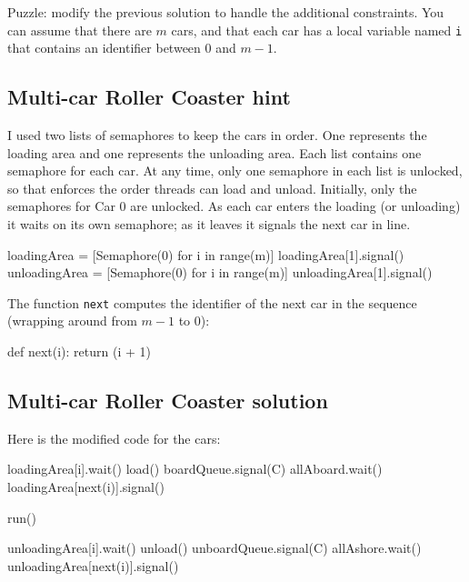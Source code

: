 \documentclass{book}
\begin{document}
Puzzle: modify
the previous solution to handle the additional constraints.
You can assume that there are $m$ cars, and that
each car has a local variable named {\tt i}
that contains an identifier between 0 and $m-1$.



\subsection{Multi-car Roller Coaster hint}

I used two lists of semaphores to keep the cars in order.  One
represents the loading area and one represents the unloading area.
Each list contains one semaphore for each car.
At any time, only one semaphore in each
list is unlocked, so that enforces the order threads can
load and unload.
Initially, only the semaphores for Car 0 are unlocked.
As each car enters the
loading (or unloading) it waits on its own semaphore; as it leaves it
signals the next car in line.

\begin{unbreakable}[title={Multi-car Roller Coaster hint}]{}
loadingArea = [Semaphore(0) 
 for i in range(m)]
loadingArea[1].signal()
unloadingArea = [Semaphore(0) 
 for i in range(m)]
unloadingArea[1].signal()
\end{unbreakable}

The function {\tt next} computes the identifier of the next
car in the sequence (wrapping around from $m-1$ to 0):

\begin{unbreakable}[title={Implementation of {\tt next}}]{}
def next(i):
    return (i + 1) %
\end{unbreakable}




\subsection{Multi-car Roller Coaster solution}

Here is the modified code for the cars:


\begin{unbreakable}[title={Multi-car Roller Coaster solution (car)}]{}
loadingArea[i].wait()
load()
boardQueue.signal(C)
allAboard.wait()
loadingArea[next(i)].signal()

run()

unloadingArea[i].wait()
unload()
unboardQueue.signal(C)
allAshore.wait()
unloadingArea[next(i)].signal()
\end{unbreakable}
\end{document}
